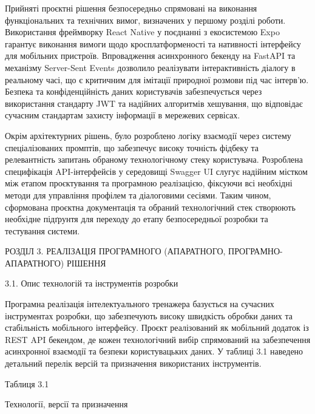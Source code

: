 \documentclass[
]{article}
\begin{document}
Прийняті проєктні рішення безпосередньо спрямовані на виконання
функціональних та технічних вимог, визначених у першому розділі роботи.
Використання фреймворку React Native у поєднанні з екосистемою Expo
гарантує виконання вимоги щодо кросплатформеності та нативності
інтерфейсу для мобільних пристроїв. Впровадження асинхронного бекенду на
FastAPI та механізму Server-Sent Events дозволило реалізувати
інтерактивність діалогу в реальному часі, що є критичним для імітації
природної розмови під час інтерв'ю. Безпека та конфіденційність даних
користувачів забезпечується через використання стандарту JWT та надійних
алгоритмів хешування, що відповідає сучасним стандартам захисту
інформації в мережевих сервісах.

Окрім архітектурних рішень, було розроблено логіку взаємодії через
систему спеціалізованих промптів, що забезпечує високу точність фідбеку
та релевантність запитань обраному технологічному стеку користувача.
Розроблена специфікація API-інтерфейсів у середовищі Swagger UI слугує
надійним містком між етапом проєктування та програмною реалізацією,
фіксуючи всі необхідні методи для управління профілем та діалоговими
сесіями. Таким чином, сформована проєктна документація та обраний
технологічний стек створюють необхідне підґрунтя для переходу до етапу
безпосередньої розробки та тестування системи.

РОЗДІЛ 3. РЕАЛІЗАЦІЯ ПРОГРАМНОГО (АПАРАТНОГО, ПРОГРАМНО-АПАРАТНОГО)
РІШЕННЯ

3.1. Опис технологій та інструментів розробки

Програмна реалізація інтелектуального тренажера базується на сучасних
інструментах розробки, що забезпечують високу швидкість обробки даних та
стабільність мобільного інтерфейсу. Проєкт реалізований як мобільний
додаток із REST API бекендом, де кожен технологічний вибір спрямований
на забезпечення асинхронної взаємодії та безпеки користувацьких даних. У
таблиці 3.1 наведено детальний перелік версій та призначення
використаних інструментів.

Таблиця 3.1

Технології, версії та призначення
\end{document}

